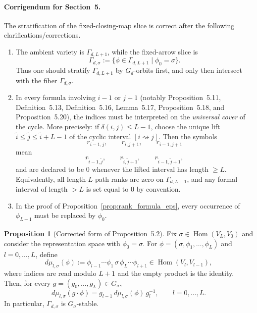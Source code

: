 \documentclass{article}
\newcommand{\Hom}{\operatorname{Hom}}
\theoremstyle{definition}
\newtheorem{proposition}[theorem]{Proposition}
\begin{document}
\paragraph{Corrigendum for Section~5.}
The stratification of the fixed-closing-map slice is correct after the following
clarifications/corrections.

\begin{enumerate}
\item[(1)] The ambient variety is \(\Gamma_{d,L+1}\), while the fixed-arrow slice is
\[
\Gamma_{d,\sigma}:=\{\phi\in \Gamma_{d,L+1}\mid \phi_0=\sigma\}.
\]
Thus one should stratify \(\Gamma_{d,L+1}\) by \(G_d\)-orbits first, and only then intersect
with the fiber \(\Gamma_{d,\sigma}\).

\item[(2)] In every formula involving \(i-1\) or \(j+1\) (notably Proposition~5.11,
Definition~5.13, Definition~5.16, Lemma~5.17, Proposition~5.18, and Proposition~5.20),
the indices must be interpreted on the \emph{universal cover} of the cycle.
More precisely: if \(\delta(i,j)\le L-1\), choose the unique lift
\(\tilde i\le \tilde j\le \tilde i+L-1\) of the cyclic interval \([i\rightsquigarrow j]\).
Then the symbols
\[
r_{i-1,j},\qquad r_{i,j+1},\qquad r_{i-1,j+1}
\]
mean
\[
r_{\tilde i-1,\tilde j},\qquad r_{\tilde i,\tilde j+1},\qquad r_{\tilde i-1,\tilde j+1},
\]
and are declared to be \(0\) whenever the lifted interval has length \(\ge L\).
Equivalently, all length-\(L\) path ranks are zero on \(\Gamma_{d,L+1}\), and any formal
interval of length \(>L\) is set equal to \(0\) by convention.

\item[(3)] In the proof of Proposition~\ref{prop:rank_formula_eps}, every occurrence of
\(\phi_{L+1}\) must be replaced by \(\phi_0\).
\end{enumerate}

\begin{proposition}[Corrected form of Proposition~5.2]
Fix \(\sigma\in \Hom(V_L,V_0)\) and consider the representation space with \(\phi_0=\sigma\).
For \(\phi=(\sigma,\phi_1,\ldots,\phi_L)\) and \(l=0,\ldots,L\), define
\[
d\mu_{l,\sigma}(\phi)
:=
\phi_{l-1}\cdots \phi_1\,\sigma\,\phi_L\cdots \phi_{l+1}
\in \Hom(V_l,V_{l-1}),
\]
where indices are read modulo \(L+1\) and the empty product is the identity.
Then, for every \(g=(g_0,\ldots,g_L)\in G_\sigma\),
\[
d\mu_{l,\sigma}(g\cdot \phi)
=
g_{l-1}\, d\mu_{l,\sigma}(\phi)\, g_l^{-1},
\qquad l=0,\ldots,L.
\]
In particular, \(\Gamma_{d,\sigma}\) is \(G_\sigma\)-stable.
\end{proposition}
\end{document}
